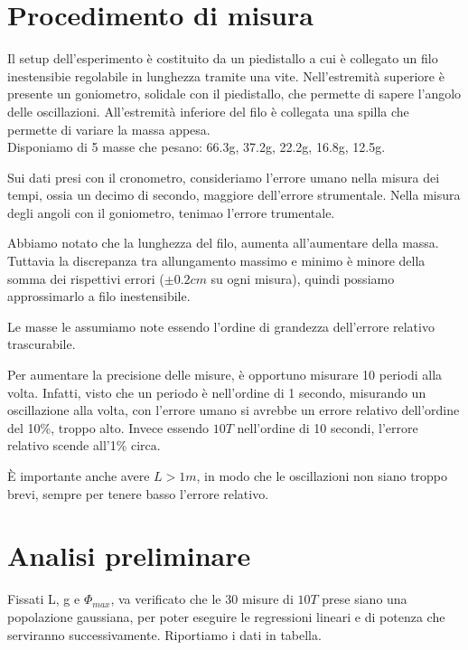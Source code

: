 \documentclass[12pt, a4paper]{article}
\begin{document}
    
\section{Procedimento di misura}
Il setup dell'esperimento è costituito da un piedistallo a cui è collegato un filo inestensibie regolabile in lunghezza tramite una vite. Nell'estremità superiore è presente un goniometro, solidale con il piedistallo, che permette di sapere l'angolo delle oscillazioni. All'estremità inferiore del filo è collegata una spilla che permette di variare la massa appesa. \\
Disponiamo di 5 masse che pesano: 66.3g, 37.2g, 22.2g, 16.8g, 12.5g.

Sui dati presi con il cronometro, consideriamo l'errore umano nella misura dei tempi, ossia un decimo di secondo, maggiore dell'errore strumentale. 
Nella misura degli angoli con il goniometro, tenimao l'errore trumentale. 

Abbiamo notato che la lunghezza del filo, aumenta all'aumentare della massa. Tuttavia la discrepanza tra allungamento massimo e minimo è minore della somma dei rispettivi errori ($\pm0.2cm$ su ogni misura), quindi possiamo approssimarlo a filo inestensibile.

Le masse le assumiamo note essendo l'ordine di grandezza dell'errore relativo trascurabile.

Per aumentare la precisione delle misure, è opportuno misurare 10 periodi alla volta.
Infatti, visto che un periodo è nell'ordine di 1 secondo, misurando un oscillazione alla volta, con l'errore umano si avrebbe un errore relativo dell'ordine del 10\%, troppo alto.
Invece essendo $10T$ nell'ordine di 10 secondi, l'errore relativo scende all'1\% circa.

È importante anche avere $L > 1m$, in modo che le oscillazioni non siano troppo brevi, sempre per tenere basso l'errore relativo.


\section{Analisi preliminare}
Fissati L, g e $\Phi_{max}$, va verificato che le 30 misure di $10T$ prese siano una popolazione gaussiana, per poter eseguire le regressioni lineari e di potenza che serviranno successivamente. Riportiamo i dati in tabella. 
\end{document}
